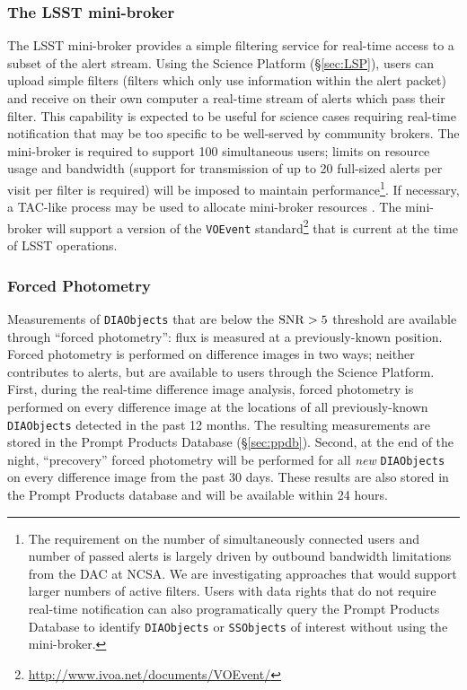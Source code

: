 \subsubsection{The LSST mini-broker}\label{sec:mini-broker}

The LSST mini-broker provides a simple filtering service for real-time access to a subset of the alert stream.
Using the Science Platform (\S \ref{sec:LSP}),
users can upload simple filters (filters which only use information within the alert packet) and receive on their own computer a real-time stream of alerts which pass their filter.
This capability is expected to be useful for science cases requiring real-time notification that may be too specific to be well-served by community brokers.
The mini-broker is required to support 100 simultaneous users; limits on resource usage and bandwidth (support for transmission of up to 20 full-sized alerts per visit per filter is required) will be imposed to maintain performance\footnote{
The requirement on the number of simultaneously connected users and number of passed alerts is largely driven by outbound bandwidth limitations from the DAC at NCSA. 
We are investigating approaches that would support larger numbers of active filters.
Users with data rights that do not require real-time notification can also programatically query the Prompt Products Database to identify \texttt{DIAObjects} or \texttt{SSObjects} of interest without using the mini-broker.}.
If necessary, a TAC-like process may be used to allocate mini-broker resources .
The mini-broker will support a version of the \texttt{VOEvent} standard\footnote{\url{http://www.ivoa.net/documents/VOEvent/}} that is current at the time of LSST operations.

\subsubsection{Forced Photometry}\label{sec:AGP_force}

Measurements of \texttt{DIAObjects} that are below the ${\rm SNR} > 5$ threshold are available through ``forced photometry'': flux is measured at a previously-known position.
Forced photometry is performed on difference images in two ways; neither contributes to alerts, but are available to users through the Science Platform.
First, during the real-time difference image analysis, forced photometry is performed on every difference image at the locations of all previously-known {\tt DIAObjects} detected in the past 12 months. 
The resulting measurements are stored in the Prompt Products Database (\S \ref{sec:ppdb}).
Second, at the end of the night, ``precovery'' forced photometry will be performed for all \textit{new} \texttt{DIAObjects} on every difference image from the past 30 days.
These results are also stored in the Prompt Products database and will be available within 24 hours.
 
